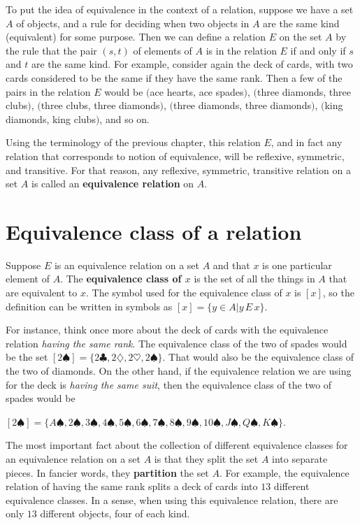   To put the idea of equivalence in the context of a relation, suppose we have
a set $A$ of objects, and a rule for deciding when two objects in $A$ are the
same kind (equivalent) for some purpose. Then we can define a relation $E$ on the
set $A$ by the rule that the pair $(s,t)$ of elements of $A$ is in the relation
$E$ if and only if $s$ and $t$ are the same kind. For example, consider again the
deck of cards, with two cards considered to be the same if they have the same
rank. Then a few of the pairs in the relation $E$ would be $($ace hearts, ace
spades$)$, $($three diamonds, three clubs$)$, $($three clubs, three diamonds$)$,
$($three 
diamonds, three diamonds$)$, $($king diamonds, king clubs$)$, and so on.

  Using the terminology of the previous chapter, this relation $E$, and in
fact any relation that corresponds to notion of equivalence, will be reflexive,
symmetric, and transitive. For that reason, any reflexive, symmetric, transitive
relation on a set $A$ is called an {\bfseries equivalence relation} on $A$.

\section{Equivalence class of a relation}
  Suppose $E$ is an equivalence relation on a set $A$ and that $x$ is one
particular element of $A$. The {\bfseries equivalence class of $x$} is the set of all
the things 
in $A$ that are equivalent to $x$. The symbol used for the equivalence class of $x$ is
$[x]$, so the definition can be written in symbols as $[x]=\{y\in A|y\,E\,x\}$.

For instance, think once more about the deck of
cards 
with the 
equivalence relation {\itshape having the same rank}. The equivalence class of the two
of spades would be the set $[2\spadesuit]=\{2\clubsuit, 2\diamondsuit, 
2\heartsuit, 2\spadesuit\}$. 
That would also be the equivalence class of the two of diamonds. On
the other hand, if the equivalence relation we are using for the deck is {\itshape having
the same suit}, then the equivalence class of the two of spades would be 

$[2\spadesuit]=\{A\spadesuit
, 2\spadesuit , 3\spadesuit , 4\spadesuit , 5\spadesuit , 6\spadesuit,
 7\spadesuit , 8\spadesuit , 9\spadesuit,
10\spadesuit , J\spadesuit , Q\spadesuit , K\spadesuit \}$.

 
 The most important fact about the collection of different equivalence
classes for an equivalence relation on a set $A$ is that they split the set $A$
into separate pieces. In fancier words, they {\bfseries partition} the set $A$. For
example, the equivalence relation of having the same rank splits a deck of cards
into $13$ different equivalence classes. In a sense, when using this equivalence
relation, there are only $13$ different objects, four of each kind.

